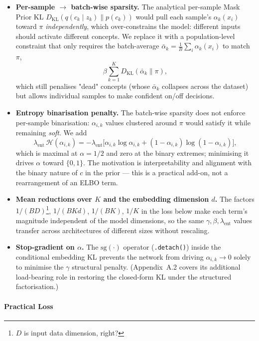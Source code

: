 \documentclass[11pt, a4paper]{article}
\begin{document}
\begin{itemize}
    \item \textbf{Per-sample $\to$ batch-wise sparsity.} The analytical per-sample Mask Prior KL $D_{\mathrm{KL}}(q(c_k \mid z_k) \parallel p(c_k))$ would pull each sample's $\alpha_k(x_i)$ toward $\pi$ \emph{independently}, which over-constrains the model: different inputs should activate different concepts. We replace it with a population-level constraint that only requires the batch-average $\bar{\alpha}_k = \tfrac{1}{B}\sum_i \alpha_k(x_i)$ to match $\pi$,
    \[
        \beta \sum_{k=1}^K D_{\mathrm{KL}}(\bar{\alpha}_k \parallel \pi),
    \]
    which still penalises "dead" concepts (whose $\bar{\alpha}_k$ collapses across the dataset) but allows individual samples to make confident on/off decisions.

    \item \textbf{Entropy binarisation penalty.} The batch-wise sparsity does not enforce per-sample binarisation: $\alpha_{i,k}$ values clustered around $\pi$ would satisfy it while remaining \emph{soft}. We add
    \[
        \lambda_{\text{ent}}\, \mathcal{H}(\alpha_{i,k}) = -\lambda_{\text{ent}}\bigl[\alpha_{i,k}\log\alpha_{i,k} + (1-\alpha_{i,k})\log(1-\alpha_{i,k})\bigr],
    \]
    which is maximal at $\alpha=1/2$ and zero at the binary extremes; minimising it drives $\alpha$ toward $\{0,1\}$. The motivation is interpretability and alignment with the binary nature of $c$ in the prior --- this is a practical add-on, not a rearrangement of an ELBO term.

\item \textbf{Mean reductions over $K$ and the embedding dimension $d$.} The factors $1/(BD)${\color{red}\footnote{\color{red}$D$ is input data dimension, right?}}, $1/(BKd)$, $1/(BK)$, $1/K$ in the loss below make each term's magnitude independent of the model dimensions, so the same $\gamma, \beta, \lambda_{\text{ent}}$ values transfer across architectures of different sizes without rescaling.

    \item \textbf{Stop-gradient on $\alpha$.} The $\mathrm{sg}(\cdot)$ operator (\texttt{.detach()}) inside the conditional embedding KL prevents the network from driving $\alpha_{i,k} \to 0$ solely to minimise the $\gamma$ structural penalty. (Appendix~A.2 covers its additional load-bearing role in restoring the closed-form KL under the structured factorisation.)
\end{itemize}

\paragraph{Practical Loss}
\end{document}
